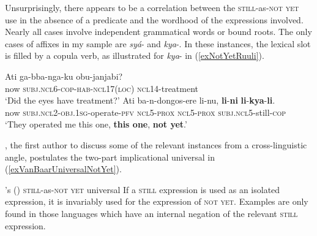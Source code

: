 Unsurprisingly, there appears to be a correlation between the \textsc{still}-as-\textsc{not yet} use in the absence of a predicate and the wordhood of the expressions involved. Nearly all cases involve independent grammatical words or bound roots. The only cases of affixes in my sample are  \mbox{\textit{syá}-} and  \mbox{\textit{kya}-}. In these instances, the lexical slot is filled by a copula verb, as illustrated for  \mbox{\textit{kya}-} in (\ref{exNotYetRuuli}).

\begin{exe}
	\ex {}\label{exNotYetRuuli}
	\begin{xlist}
		 \gll Ati ga-bba-nga-ku obu-janjabi?\\
		now \textsc{subj}.\textsc{ncl}6-\textsc{cop}-\textsc{hab}-\textsc{ncl}17(\textsc{loc}) \textsc{ncl}14-treatment\\
		\glt \lq Did the eyes have treatment?'
		\gll Ati ba-n-dongos-ere li-nu, \textbf{li}-\textbf{ni} \textbf{li}-\textbf{kya}-\textbf{li}.\\
		now \textsc{subj}.\textsc{ncl}2-\textsc{obj}.1\textsc{sg}-operate-\textsc{pfv} \textsc{ncl}5-\textsc{prox} \textsc{ncl}5-\textsc{prox} \textsc{subj}.\textsc{ncl}5-still-\textsc{cop}\\
		\glt \lq They operated me this one, \textbf{this one}, \textbf{not yet}.\rq{}
		\\\parencite{RuuliCorpus}
	\end{xlist}
\end{exe}

\Textcite{vanBaar1997}, the first author to discuss some of the relevant instances from a cross-linguistic angle, postulates the two-part implicational universal in (\ref{exVanBaarUniversalNotYet}).

\begin{exe}
	\ex \label{exVanBaarUniversalNotYet}
	\begin{xlist}
		\exi{}\citeauthor{vanBaar1997}'s (\citeyear[295]{vanBaar1997}) \textsc{still}-as-\textsc{not yet} universal
		\ex\label{exVanBaarUniversalNotYet1}
		If a \textsc{still} expression is used as an isolated expression, it is invariably used for the expression of \textsc{not yet}.
		\ex\label{exVanBaarUniversalNotYet2}
		Examples are only found in those languages which have an internal negation of the relevant \textsc{still} expression.
	\end{xlist}
\end{exe}

